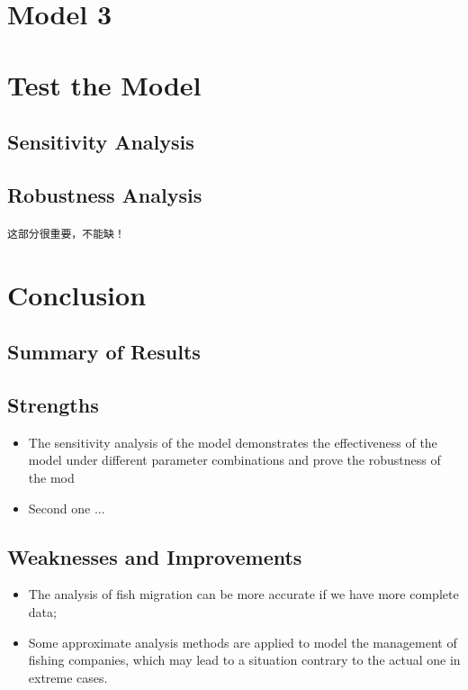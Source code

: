 \documentclass[12pt]{ctexart}
\begin{document}
\section{Model 3}
\section{Test the Model}
\subsection{Sensitivity  Analysis}
\subsection{Robustness Analysis}
\texttt{这部分很重要，不能缺！}








\section{Conclusion}
\subsection{Summary of Results}

\subsection{Strengths}%
\begin{itemize}
	\item The sensitivity analysis of the model demonstrates the effectiveness of the model under different parameter combinations and prove the robustness of the mod
	\item Second one ...
\end{itemize}

\subsection{Weaknesses and Improvements}%
\begin{itemize}
	\item The analysis of fish migration can be more accurate if we have more complete data;
	\item Some approximate analysis methods are applied to model the management of fishing
	      companies, which may lead to a situation contrary to the actual one  in extreme cases.
\end{itemize}
\end{document}
